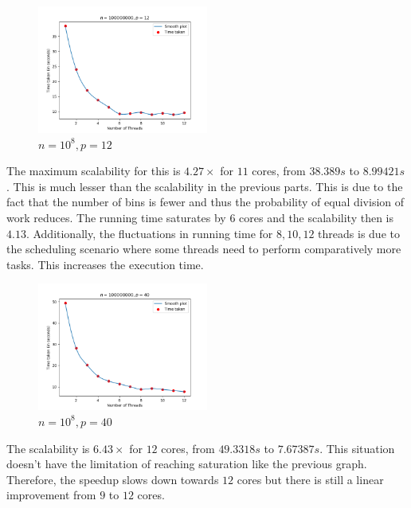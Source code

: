 \documentclass[11pt]{article}
\begin{document}
\begin{figure}[H]
	\begin{center}
		\includegraphics[width=0.5\textwidth]{outputs/1e8_12_t12.png}
	\end{center}
	\caption{$n = 10^8, p = 12$}
	\label{fig:1e8_12}
\end{figure}
The maximum scalability for this is $4.27\times$ for $11$ cores, from $38.389s$ to $8.99421s$. This is much lesser than the scalability in the previous parts. This is due to the fact that the number of bins is fewer and thus the probability of equal division of work reduces. The running time saturates by $6$ cores and the scalability then is $4.13$. Additionally, the fluctuations in running time for $8, 10, 12$ threads is due to the scheduling scenario where some threads need to perform comparatively more tasks. This increases the execution time.

\begin{figure}[H]
	\begin{center}
		\includegraphics[width=0.5\textwidth]{outputs/1e8_40_t12.png}
	\end{center}
	\caption{$n = 10^8, p = 40$}
	\label{fig:1e8_40}
\end{figure}
The scalability is $6.43\times$ for $12$ cores, from $49.3318s$ to $7.67387s$. This situation doesn't have the limitation of reaching saturation like the previous graph. Therefore, the speedup slows down towards $12$ cores but there is still a linear improvement from $9$ to $12$ cores.
\end{document}
